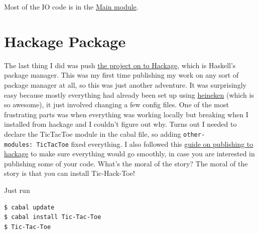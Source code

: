 \documentclass[12pt]{article}
\begin{document}
	Most of the IO code is in the
	\href{https://github.com/2016rshah/Tic-Hack-Toe/blob/master/src/Main.hs}{Main
	module}.

	\section{Hackage Package}\label{hackage-package}

	The last thing I did was push
	\href{https://hackage.haskell.org/package/Tic-Tac-Toe-0.1.0.2}{the
	project on to Hackage}, which is Haskell's package manager. This was my
	first time publishing my work on any sort of package manager at all, so
	this was just another adventure. It was surprisingly easy because mostly
	everything had already been set up using
	\href{https://github.com/khanage/heineken}{heineken} (which is so
	awesome), it just involved changing a few config files. One of the most
	frustrating parts was when everything was working locally but breaking
	when I installed from hackage and I couldn't figure out why. Turns out I
	needed to declare the TicTacToe module in the cabal file, so adding
	\texttt{other-modules:\ TicTacToe} fixed everything. I also followed
	this
	\href{http://begriffs.com/posts/2014-10-25-creating-package-hackage.html}{guide
	on publishing to hackage} to make sure everything would go smoothly, in
	case you are interested in publishing some of your code. What's the
	moral of the story? The moral of the story is that you can install
	Tic-Hack-Toe!

	Just run

	\begin{lstlisting}
$ cabal update 
$ cabal install Tic-Tac-Toe 
$ Tic-Tac-Toe 
	\end{lstlisting}
\end{document}
